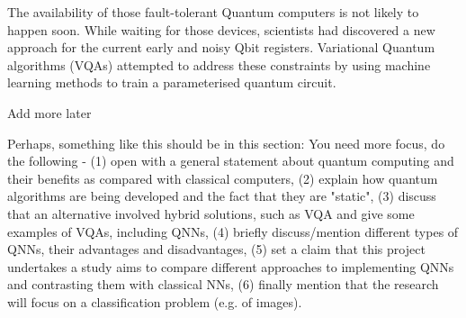 The availability of those fault-tolerant Quantum computers is not likely to happen soon. 
While waiting for those devices, scientists had discovered a new approach for the current early and noisy Qbit registers.
Variational Quantum algorithms (VQAs) \cite{cerezo2021variational} attempted to address these constraints by using machine learning methods to train a parameterised quantum circuit.
\begin{center}
    \vspace{10pt}
    Add more later
    \vspace{10pt} 
\end{center}
Perhaps, something like this should be in this section: You need more focus, do the following - (1) open with a general statement about quantum computing and their benefits as compared with classical computers, (2) explain how quantum algorithms are being developed and the fact that they are "static", (3) discuss that an alternative involved hybrid solutions, such as VQA and give some examples of VQAs, including QNNs, (4) briefly discuss/mention different types of QNNs, their advantages and disadvantages, (5) set a claim that this project undertakes a study aims to compare different approaches to implementing QNNs and contrasting them with classical NNs, (6) finally mention that the research will focus on a classification problem (e.g. of images).
